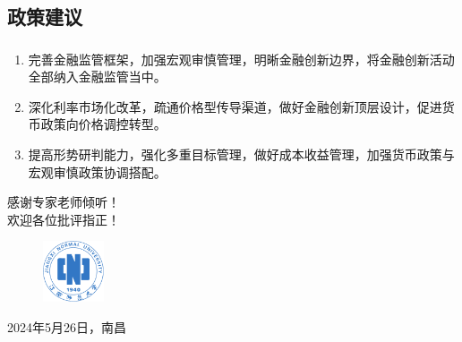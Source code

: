 \documentclass[12pt,aspectratio=169]{ctexbeamer}
\begin{document}
			\subsection{政策建议}
			\begin{frame}
				\frametitle{}
				\begin{enumerate}
					\justifying
					\item 完善金融监管框架，加强宏观审慎管理，明晰金融创新边界，将金融创新活动全部纳入金融监管当中。
					\item 深化利率市场化改革，疏通价格型传导渠道，做好金融创新顶层设计，促进货币政策向价格调控转型。
					\item 提高形势研判能力，强化多重目标管理，做好成本收益管理，加强货币政策与宏观审慎政策协调搭配。
				\end{enumerate}
			\end{frame}
			\begin{frame}
				\centering
				\Large 感谢专家老师倾听！\\
				欢迎各位批评指正！
				\begin{figure}
					\includegraphics[width=18mm]{logo}
				\end{figure}
				\normalsize 2024年5月26日，南昌
			\end{frame}
		
\end{document}
